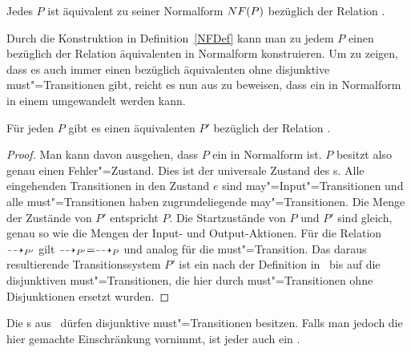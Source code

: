 \begin{Prop}[Normalform]
  Jedes \MEIO{} $P$ ist äquivalent zu seiner Normalform $NF (P)$ bezüglich
  der Relation \ERel{}.
\end{Prop}

Durch die Konstruktion in Definition~\ref{NFDef} kann man zu jedem \MEIO{} $P$
einen bezüglich der Relation \ERel{} äquivalenten \MEIO{} in Normalform
konstruieren. Um zu zeigen, dass es auch immer einen bezüglich \ERel{}
äquivalenten \MIA{} ohne disjunktive must"=Transitionen gibt, reicht es nun
aus zu beweisen, dass ein \MEIO{} in Normalform in einem \MIA{} umgewandelt
werden kann.

\begin{Satz}
  Für jeden \MEIO{} $P$ gibt es einen äquivalenten \MIA{} $P'$ bezüglich der
  Relation \ERel{}.
\end{Satz}
\begin{proof}
  Man kann \oBdA{} davon ausgehen, dass $P$ ein \MEIO{} in Normalform ist. $P$
  besitzt also genau einen Fehler"=Zustand. Dies ist der universale Zustand des
  \MIA{}s. Alle eingehenden Transitionen in den Zustand $e$ sind
  may"=Input"=Transitionen und alle must"=Transitionen haben zugrundeliegende
  may"=Transitionen. Die Menge der Zustände von $P'$ entspricht $P$. Die
  Startzustände von $P$ und $P'$ sind gleich, genau so wie die Mengen der
  Input- und Output-Aktionen. Für die Relation $\may _{P'}$ gilt $\may _{P'} =
  \may _{P}$ und analog für die must"=Transition. Das daraus resultierende
  Transitionssystem $P'$ ist ein \MIA{} nach der Definition
  in~\cite{Vogler2016MIA3} bis auf die disjunktiven must"=Transitionen, die
  hier durch must"=Transitionen ohne Disjunktionen ersetzt wurden.
\end{proof}

Die \MIA{}s aus~\cite{Vogler2016MIA3} dürfen disjunktive must"=Transitionen
besitzen. Falls man jedoch die hier gemachte Einschränkung vornimmt, ist jeder
\MIA{} auch ein \MEIO{}.
